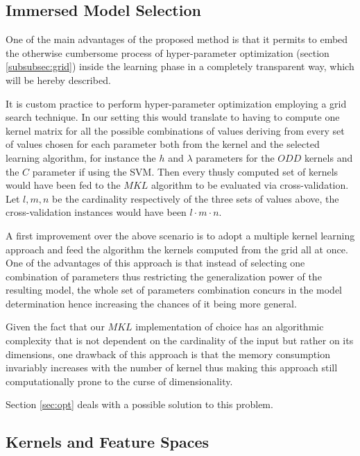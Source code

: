 
\subsection{Immersed Model Selection}
\label{subsec:parameters}
One of the main advantages of the proposed method is that it permits to embed
the otherwise cumbersome process of hyper-parameter optimization (section \ref{subsubsec:grid})
inside the learning phase in a completely transparent way, which will be hereby
described.

It is custom practice to perform hyper-parameter optimization employing a grid
search technique.
In our setting this would translate to having to compute one kernel matrix
for all the possible combinations of values deriving from every set of values
chosen for each parameter both from the kernel and the selected learning
algorithm, for instance the $h$ and $\lambda$ parameters for the $ODD$ kernels
and the $C$ parameter if using the SVM.
Then every thusly computed set of kernels would have been fed to the $MKL$
algorithm to be evaluated via cross-validation.
Let $l,m,n$ be the cardinality respectively of the three sets of values above,
the cross-validation instances would have been $l\cdot m\cdot n$.

A first improvement over the above scenario is to adopt a multiple kernel learning
approach and feed the algorithm the kernels computed from the grid all at once.
One of the advantages of this approach is that instead of selecting one combination
of parameters thus restricting the generalization power of the resulting model,
the whole set of parameters combination concurs in the model determination hence
increasing the chances of it being more general.

Given the fact that our $MKL$ implementation of choice has an algorithmic
complexity that is not dependent on the cardinality of the input but rather on
its dimensions, one drawback of this approach is that the memory consumption
invariably increases with the number of kernel thus making this approach still
computationally prone to the curse of dimensionality.

Section \ref{sec:opt} deals with a possible solution to this problem.

\subsection{Kernels and Feature Spaces}
\label{subsec:features}


